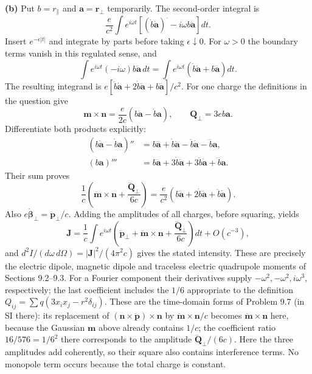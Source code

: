 \medskip\noindent\textbf{(b)} Put $b=r_\parallel$ and
$\mathbf a=\mathbf r_\perp$ temporarily.  The second-order integral
is
\[
\frac e{c^2}\int e^{i\omega t}
 [(\dot b\dot{\mathbf a})^{\displaystyle\cdot}
 -i\omega b\ddot{\mathbf a}]dt.
\]
Insert $e^{-\epsilon|t|}$ and integrate by parts before taking
$\epsilon\downarrow0$.  For $\omega>0$ the boundary terms vanish
in this regulated sense, and
\[
\int e^{i\omega t}(-i\omega)b\ddot{\mathbf a}\,dt
=\int e^{i\omega t}(\dot b\ddot{\mathbf a}
+b\dddot{\mathbf a})dt.
\]
The resulting integrand is
$e[\ddot b\dot{\mathbf a}+2\dot b\ddot{\mathbf a}
+b\dddot{\mathbf a}]/c^2$.
For one charge the definitions in the question give
\[
\mathbf m\times\mathbf n=\frac e{2c}
 (b\dot{\mathbf a}-\dot b\mathbf a),\qquad
\mathbf Q_\perp=3eb\mathbf a.
\]
Differentiate both products explicitly:
\begin{align*}
(b\dot{\mathbf a}-\dot b\mathbf a)''
 &=b\dddot{\mathbf a}+\dot b\ddot{\mathbf a}
  -\ddot b\dot{\mathbf a}-\dddot b\mathbf a,\\
(b\mathbf a)'''&=b\dddot{\mathbf a}+3\dot b\ddot{\mathbf a}
 +3\ddot b\dot{\mathbf a}+\dddot b\mathbf a.
\end{align*}
Their sum proves
\[
\frac1c\left(\ddot{\mathbf m}\times\mathbf n+
 \frac{\dddot{\mathbf Q}_\perp}{6c}\right)
=\frac e{c^2}(b\dddot{\mathbf a}+2\dot b\ddot{\mathbf a}
+\ddot b\dot{\mathbf a}).
\]
Also $e\dot{\boldsymbol\beta}_\perp=\ddot{\mathbf p}_\perp/c$.
Adding the amplitudes of all charges, before squaring, yields
\[
\boxed{\mathbf J=\frac1c\int e^{i\omega t}
 \left(\ddot{\mathbf p}_\perp+\ddot{\mathbf m}\times\mathbf n
 +\frac{\dddot{\mathbf Q}_\perp}{6c}\right)dt+O(c^{-3}),}
\]
and $d^2I/(d\omega\,d\Omega)=|\mathbf J|^2/(4\pi^2c)$ gives
the stated intensity.  These are precisely the electric dipole,
magnetic dipole and traceless electric quadrupole moments of
Sections 9.2--9.3.  For a Fourier component their derivatives
supply $-\omega^2,-\omega^2,i\omega^3$, respectively; the last
coefficient includes the $1/6$ appropriate to the definition
$Q_{ij}=\sum q(3x_ix_j-r^2\delta_{ij})$.  These are the
time-domain forms of Problem 9.7 (in SI there): its replacement of
$(\mathbf n\times\ddot{\mathbf p})\times\mathbf n$ by
$\ddot{\mathbf m}\times\mathbf n/c$ becomes
$\ddot{\mathbf m}\times\mathbf n$ here, because the Gaussian
$\mathbf m$ above already contains $1/c$; the coefficient ratio
$16/576=1/6^2$ there corresponds to the amplitude
$\dddot{\mathbf Q}_\perp/(6c)$.  Here the three amplitudes
add coherently, so their square also contains interference terms.
No monopole term occurs because the total charge is constant.

